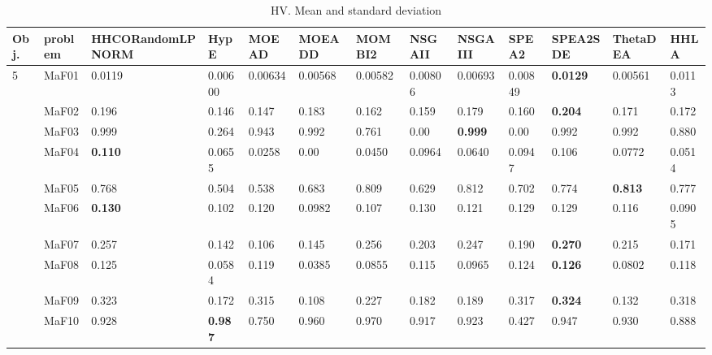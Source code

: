 \documentclass[]{article}
\begin{document}
\begin{landscape}
\begin{table}
\caption{HV. Mean and standard deviation}
\label{table:mean.HV}
\centering
\begin{footnotesize}
\begin{tabular}{|l|l|l|l|l|l|l|l|l|l|l|l|l|}
\hline
Obj. & problem  & HHCORandomLPNORM & HypE & MOEAD & MOEADD & MOMBI2 & NSGAII & NSGAIII & SPEA2 & SPEA2SDE & ThetaDEA & HHLA \\ \hline

\multirow{15}{*}{5} & MaF01 & \cellcolor{gray95} 0.0119 & 0.00600 & 0.00634 & 0.00568 & 0.00582 & 0.00806 & 0.00693 & \cellcolor{gray95} 0.00849 & \cellcolor{gray95} {\bf 0.0129} & 0.00561 & \cellcolor{gray95} 0.0113\\
 & MaF02 & \cellcolor{gray95} 0.196 & 0.146 & 0.147 & \cellcolor{gray95} 0.183 & 0.162 & 0.159 & 0.179 & 0.160 & \cellcolor{gray95} {\bf 0.204} & 0.171 & 0.172\\
 & MaF03 & \cellcolor{gray95} 0.999 & 0.264 & 0.943 & 0.992 & 0.761 & 0.00 & \cellcolor{gray95} {\bf 0.999} & 0.00 & 0.992 & 0.992 & 0.880\\
 & MaF04 & \cellcolor{gray95} {\bf 0.110} & 0.0655 & 0.0258 & 0.00 & 0.0450 & \cellcolor{gray95} 0.0964 & 0.0640 & \cellcolor{gray95} 0.0947 & \cellcolor{gray95} 0.106 & 0.0772 & 0.0514\\
 & MaF05 & 0.768 & 0.504 & 0.538 & 0.683 & \cellcolor{gray95} 0.809 & 0.629 & \cellcolor{gray95} 0.812 & 0.702 & 0.774 & \cellcolor{gray95} {\bf 0.813} & \cellcolor{gray95} 0.777\\
 & MaF06 & \cellcolor{gray95} {\bf 0.130} & 0.102 & 0.120 & 0.0982 & 0.107 & \cellcolor{gray95} 0.130 & 0.121 & \cellcolor{gray95} 0.129 & \cellcolor{gray95} 0.129 & 0.116 & 0.0905\\
 & MaF07 & \cellcolor{gray95} 0.257 & 0.142 & 0.106 & 0.145 & \cellcolor{gray95} 0.256 & 0.203 & \cellcolor{gray95} 0.247 & 0.190 & \cellcolor{gray95} {\bf 0.270} & 0.215 & 0.171\\
 & MaF08 & \cellcolor{gray95} 0.125 & 0.0584 & 0.119 & 0.0385 & 0.0855 & 0.115 & 0.0965 & \cellcolor{gray95} 0.124 & \cellcolor{gray95} {\bf 0.126} & 0.0802 & 0.118\\
 & MaF09 & \cellcolor{gray95} 0.323 & 0.172 & 0.315 & 0.108 & 0.227 & 0.182 & 0.189 & \cellcolor{gray95} 0.317 & \cellcolor{gray95} {\bf 0.324} & 0.132 & \cellcolor{gray95} 0.318\\
 & MaF10 & 0.928 & \cellcolor{gray95} {\bf 0.987} & 0.750 & \cellcolor{gray95} 0.960 & \cellcolor{gray95} 0.970 & 0.917 & 0.923 & 0.427 & 0.947 & 0.930 & 0.888\\

\end{tabular}
\end{footnotesize}
\end{table}
\end{landscape}
\end{document}

